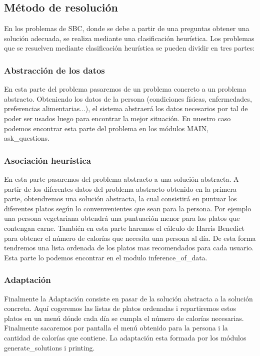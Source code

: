 \documentclass[11]{article}
\begin{document}
\subsection{Método de resolución}

En los problemas de SBC, donde se debe a partir de una preguntas obtener una solución adecuada, se realiza mediante una clasificación heurística.
Los problemas que se resuelven mediante clasificación heurística se pueden dividir en tres partes:

\subsubsection{Abstracción de los datos}

En esta parte del problema pasaremos de un problema concreto a un problema abstracto. 
Obteniendo los datos de la persona (condiciones físicas, enfermedades, preferencias alimentarias...), el sistema abstraerá los datos necesarios por tal de poder ser usados luego para encontrar la mejor situación.
En nuestro caso podemos encontrar esta parte del problema en los módulos MAIN, ask\_questions.

\subsubsection{Asociación heurística}

En esta parte pasaremos del problema abstracto a una solución abstracta.
A partir de los diferentes datos del problema abstracto obtenido en la primera parte, obtendremos una solución abstracta, la cual consistirá en puntuar los diferentes platos según lo convenvenientes que sean para la persona.
Por ejemplo una persona vegetariana obtendrá una puntuación menor para los platos que contengan carne.
También en esta parte haremos el cálculo de Harris Benedict para obtener el número de calorías que necesita una persona al día.
De esta forma tendremos una lista ordenada de los platos mas recomendados para cada usuario.
Esta parte lo podemos encontrar en el modulo inference\_of\_data.

\subsubsection{Adaptación}

Finalmente la Adaptación consiste en pasar de la solución abstracta a la solución concreta.
Aquí cogeremos las listas de platos ordenadas i repartiremos estos platos en un menú dónde cada día se cumpla el número de calorías necesarias.
Finalmente sacaremos por pantalla el menú obtenido para la persona i la cantidad de calorías que contiene.
La adaptación esta formada por los módulos generate\_solutions i printing.
\end{document}

